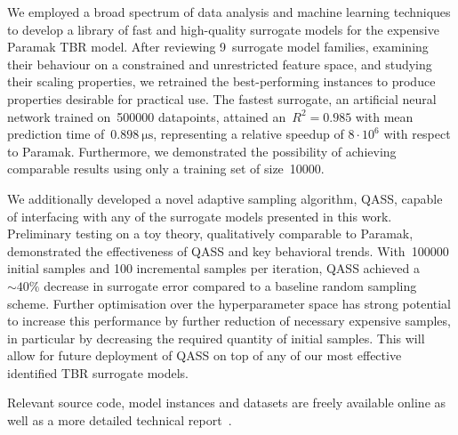 We employed a broad spectrum of data
analysis and machine learning techniques to develop a library of fast and high-quality
surrogate models for the expensive Paramak TBR model. After reviewing
9~surrogate model families, examining their behaviour on a constrained and
unrestricted feature space, and studying their scaling properties, we retrained
the best-performing instances to produce properties desirable for
practical use. The fastest surrogate, an artificial neural network trained
on~\num{500000} datapoints, attained an~$R^2=\num{0.985}$ with mean prediction time
of~$\SI{0.898}{\micro\second}$, representing a relative
speedup of $8\cdot 10^6$ with respect to Paramak. Furthermore, we demonstrated the possibility of achieving comparable results using only a
training set of size~\num{10000}.

We additionally developed a novel adaptive
sampling algorithm, QASS, capable of interfacing with any of the surrogate models presented in this work.
Preliminary testing on a toy theory, qualitatively comparable to
Paramak, demonstrated the effectiveness of QASS and key behavioral trends. With~\num{100000} initial samples
and 100 incremental samples per iteration, QASS achieved a ${\sim}40\%$ decrease
in surrogate error compared to a baseline random sampling scheme. Further optimisation over the hyperparameter space has strong potential to increase this performance by further reduction of necessary expensive samples, in particular by decreasing the required quantity of initial samples. This will allow for future deployment of QASS on top of any of our most effective identified TBR surrogate models.

Relevant source code, model instances and datasets are freely
available online as well as a more detailed technical
report~\cite{github,finalreport}.
